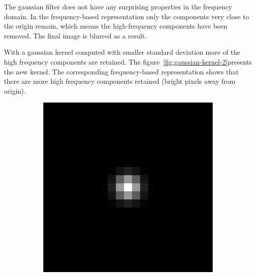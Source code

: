 \documentclass[]{article}
\begin{document}
The gaussian filter does not have any surprising properties in the frequency
domain. In the frequency-based representation only the components very close to
the origin remain, which means the high-frequency components have been removed.
The final image is blurred as a result.

With a gaussian kernel computed with smaller standard deviation more of the high
frequency components are retained. The
figure~\ref{fig:gaussian-kernel-2}presents the new kernel. The corresponding
frequency-based representation shows that there are more high frequency
components retained (bright pixels away from origin).
\begin{figure}
  \label{fig:gaussian-kernel-2}
  \centering
    \begin{subfigure}[t]{0.49\textwidth}
      \centering
      \includegraphics[width=0.99\linewidth]{kernel2.png}
    \end{subfigure}
    \begin{subfigure}[t]{0.49\textwidth}
      \centering

\end{subfigure}
\end{figure}
\end{document}

